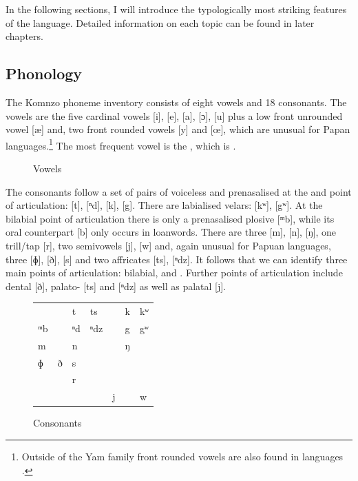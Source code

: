 In the following sections, I will introduce the typologically most striking features of the language. Detailed information on each topic can be found in later chapters.

\subsection{Phonology}

The Komnzo phoneme inventory consists of eight vowels and 18 consonants. The vowels are the five cardinal vowels [i], [e], [a], [ɔ], [u] plus a low front unrounded vowel [æ] and, two front rounded vowels [y] and [œ], which are unusual for Papan languages.\footnote{Outside of the Yam family front rounded vowels are also found in  languages \citep[60]{vanEnk:1997tl}.} The most frequent vowel is the , which is .

\begin{figure}
	{
		\begin{vowel}[plain]
		\end{vowel}
	}%
	\caption{Vowels}
	\label{fig-01-vowels}
\end{figure}%

The consonants follow a set of pairs of voiceless and prenasalised  at the  and  point of articulation: [t], [ⁿd], [k], [{\ᵑ}g]. There are labialised velars: [kʷ], [{\ᵑ}gʷ]. At the bilabial point of articulation there is only a prenasalised plosive [ᵐb], while its oral counterpart [b] only occurs in loanwords. There are three  [m], [n], [ŋ], one trill/tap [r], two semivowels [j], [w] and, again unusual for Papuan languages, three  [ɸ], [ð], [s] and two affricates [ts], [ⁿdz]. It follows that we can identify three main points of articulation: bilabial,  and . Further points of articulation include dental [ð], palato- [ts] and [ⁿdz] as well as palatal [j].

\begin{figure}
	\begin{tabularx}{\textwidth}{XXXXXXX}
		&&t&ts&&k&kʷ\\
		ᵐb&&ⁿd&ⁿdz&&{\ᵑ}g&{\ᵑ}gʷ\\
		m&&n&&&ŋ&\\
		ɸ&ð&s&&&&\\
		&&r&&&&\\
		&&&&j&&w\\
	\end{tabularx}
	\caption{Consonants}
	\label{fig-01-consonants}
\end{figure}%

